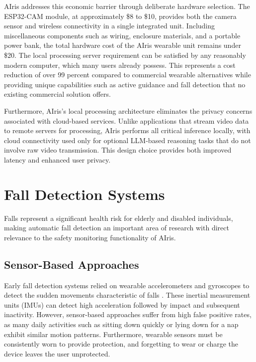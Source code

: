 \documentclass[12pt,a4paper]{report}
\begin{document}
AIris addresses this economic barrier through deliberate hardware selection. The ESP32-CAM module, at approximately \$8 to \$10, provides both the camera sensor and wireless connectivity in a single integrated unit. Including miscellaneous components such as wiring, enclosure materials, and a portable power bank, the total hardware cost of the AIris wearable unit remains under \$20. The local processing server requirement can be satisfied by any reasonably modern computer, which many users already possess. This represents a cost reduction of over 99 percent compared to commercial wearable alternatives while providing unique capabilities such as active guidance and fall detection that no existing commercial solution offers.

Furthermore, AIris's local processing architecture eliminates the privacy concerns associated with cloud-based services. Unlike applications that stream video data to remote servers for processing, AIris performs all critical inference locally, with cloud connectivity used only for optional LLM-based reasoning tasks that do not involve raw video transmission. This design choice provides both improved latency and enhanced user privacy.

\section{Fall Detection Systems}

Falls represent a significant health risk for elderly and disabled individuals, making automatic fall detection an important area of research with direct relevance to the safety monitoring functionality of AIris.

\subsection{Sensor-Based Approaches}

Early fall detection systems relied on wearable accelerometers and gyroscopes to detect the sudden movements characteristic of falls \cite{fallaccel}. These inertial measurement units (IMUs) can detect high acceleration followed by impact and subsequent inactivity. However, sensor-based approaches suffer from high false positive rates, as many daily activities such as sitting down quickly or lying down for a nap exhibit similar motion patterns. Furthermore, wearable sensors must be consistently worn to provide protection, and forgetting to wear or charge the device leaves the user unprotected.
\end{document}
